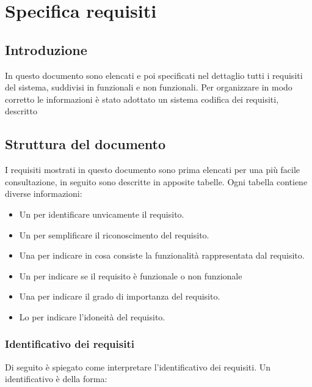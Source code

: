 \chapter{Specifica requisiti} 
\label{cha:specifica_sistema}

\section{Introduzione} 
In questo documento sono elencati e poi specificati nel dettaglio tutti i requisiti del sistema, suddivisi in funzionali e non funzionali.
Per organizzare in modo corretto le informazioni è stato adottato un sistema codifica dei requisiti, descritto 

\section{Struttura del documento}
\label{cha:struttura_del_documento}

I requisiti mostrati in questo documento sono prima elencati per una più facile consultazione, in seguito sono descritte in apposite tabelle. 
Ogni tabella contiene diverse informazioni:
\begin{itemize}
	\item Un  per identificare unvicamente il requisito.
	\item Un  per semplificare il riconoscimento del requisito.
	\item Una  per indicare in cosa consiste la funzionalità rappresentata dal requisito.
	\item Un  per indicare se il requisito è funzionale o non funzionale
	\item Una  per indicare il grado di importanza del requisito.
	\item Lo  per indicare l'idoneità del requisito.
\end{itemize}

\subsection{Identificativo dei requisiti}
\label{cha:identificativo_dei_requisiti}

Di seguito è spiegato come interpretare l'identificativo dei requisiti.
Un identificativo è della forma:
\begin{center}
\end{center}

